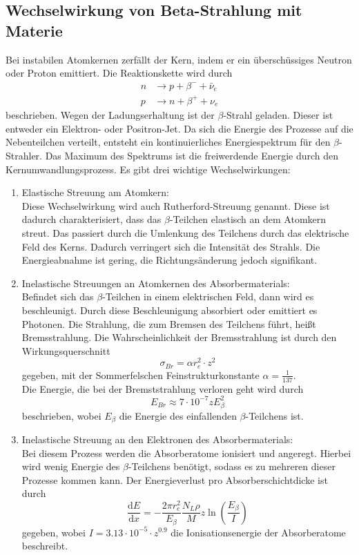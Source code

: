 \subsection{Wechselwirkung von Beta-Strahlung mit Materie}
Bei instabilen Atomkernen zerfällt der Kern, indem er ein überschüssiges Neutron oder Proton emittiert. Die Reaktionskette wird durch
\begin{align*}
  n &\rightarrow p+\beta^- + \bar\nu_e\\
  p &\rightarrow n+\beta^+ + \nu_e
\end{align*}
beschrieben. Wegen der Ladungserhaltung ist der $\beta$-Strahl geladen. Dieser ist entweder ein Elektron- oder Positron-Jet. Da sich die Energie des Prozesse auf die Nebenteilchen verteilt, entsteht ein kontinuierliches Energiespektrum für den $\beta$-Strahler. Das Maximum des Spektrums ist die freiwerdende Energie durch den Kernumwandlungsprozess. Es gibt drei wichtige Wechselwirkungen:
\begin{enumerate}[nosep,label=\textsc{\arabic*},leftmargin=*]
\item Elastische Streuung am Atomkern:\\
Diese Wechselwirkung wird auch Rutherford-Streuung genannt. Diese ist dadurch charakterisiert, dass das $\beta$-Teilchen elastisch an dem Atomkern streut. Das passiert durch die Umlenkung des Teilchens durch das elektrische Feld des Kerns. Dadurch verringert sich die Intensität des Strahls. Die Energieabnahme ist gering, die Richtungsänderung jedoch signifikant. 
\item Inelastische Streuungen an Atomkernen des Absorbermaterials:\\
Befindet sich das $\beta$-Teilchen in einem elektrischen Feld, dann wird es beschleunigt. Durch diese Beschleunigung absorbiert oder emittiert es Photonen. Die Strahlung, die zum Bremsen des Teilchens führt, heißt Bremsstrahlung. Die Wahrscheinlichkeit der Bremsstrahlung ist durch den Wirkungsquerschnitt
\begin{equation*}
  \sigma_{Br}=\alpha r_e^2\cdot z^2
\end{equation*}
gegeben, mit der Sommerfelschen Feinstrukturkonstante $\alpha=\frac{1}{137}$.\\
Die Energie, die bei der Bremststrahlung verloren geht wird durch 
\begin{equation*}
  E_{Br}\approx 7\cdot 10^{-7}zE_{\beta}^2
\end{equation*}
beschrieben, wobei $E_\beta$ die Energie des einfallenden $\beta$-Teilchens ist. 
\item Inelastische Streuung an den Elektronen des Absorbermaterials:\\
Bei diesem Prozess werden die Absorberatome ionisiert und angeregt. Hierbei wird wenig Energie des $\beta$-Teilchens benötigt, sodass es zu mehreren dieser Prozesse kommen kann. Der Energieverlust pro Absorberschichtdicke ist durch
\begin{equation*}
  \frac{\textrm{d}E}{\textrm{d}x}=-\frac{2\pi r_e^2}{E_\beta}\frac{N_L \rho}{M}z\ln(\frac{E_\beta}{I})
\end{equation*}
gegeben, wobei $I=3.13\cdot 10^{-5}\cdot z^{0.9}$ die Ionisationsenergie der Absorberatome beschreibt. 
\end{enumerate}
